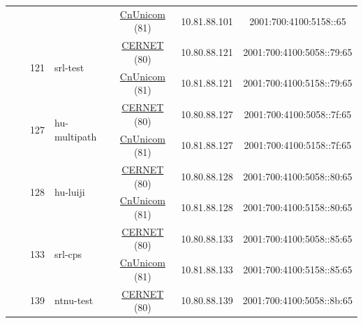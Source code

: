 \begin{small}
\begin{center}
\begin{longtable}{|c|c|c|c|c|c|c|c|}
  &  & \multicolumn{2}{|c|}{} & \multicolumn{2}{|c|}{\tiny{\href{http://www.chinaunicom.com}{CnUnicom} (81)}} & \tiny{10.81.88.101} & \tiny{2001:700:4100:5158::65} \\* \cline{3-3}\cline{4-4}\cline{5-5}\cline{6-6}\cline{7-7}\cline{8-8}
  &  & \multirow{2}{*}{\tiny{121}} & \multicolumn{1}{|l|}{\multirow{2}{*}{\tiny{srl-test}}} & \multicolumn{2}{|c|}{\tiny{\href{http://www.cernet.edu.cn}{CERNET} (80)}} & \tiny{10.80.88.121} & \tiny{2001:700:4100:5058::79:65} \\* \cline{5-5}\cline{6-6}\cline{7-7}\cline{8-8}
  &  &  &  & \multicolumn{2}{|c|}{\tiny{\href{http://www.chinaunicom.com}{CnUnicom} (81)}} & \tiny{10.81.88.121} & \tiny{2001:700:4100:5158::79:65} \\* \cline{3-3}\cline{4-4}\cline{5-5}\cline{6-6}\cline{7-7}\cline{8-8}
  &  & \multirow{2}{*}{\tiny{127}} & \multicolumn{1}{|l|}{\multirow{2}{*}{\tiny{hu-multipath}}} & \multicolumn{2}{|c|}{\tiny{\href{http://www.cernet.edu.cn}{CERNET} (80)}} & \tiny{10.80.88.127} & \tiny{2001:700:4100:5058::7f:65} \\* \cline{5-5}\cline{6-6}\cline{7-7}\cline{8-8}
  &  &  &  & \multicolumn{2}{|c|}{\tiny{\href{http://www.chinaunicom.com}{CnUnicom} (81)}} & \tiny{10.81.88.127} & \tiny{2001:700:4100:5158::7f:65} \\* \cline{3-3}\cline{4-4}\cline{5-5}\cline{6-6}\cline{7-7}\cline{8-8}
  &  & \multirow{2}{*}{\tiny{128}} & \multicolumn{1}{|l|}{\multirow{2}{*}{\tiny{hu-luiji}}} & \multicolumn{2}{|c|}{\tiny{\href{http://www.cernet.edu.cn}{CERNET} (80)}} & \tiny{10.80.88.128} & \tiny{2001:700:4100:5058::80:65} \\* \cline{5-5}\cline{6-6}\cline{7-7}\cline{8-8}
  &  &  &  & \multicolumn{2}{|c|}{\tiny{\href{http://www.chinaunicom.com}{CnUnicom} (81)}} & \tiny{10.81.88.128} & \tiny{2001:700:4100:5158::80:65} \\* \cline{3-3}\cline{4-4}\cline{5-5}\cline{6-6}\cline{7-7}\cline{8-8}
  &  & \multirow{2}{*}{\tiny{133}} & \multicolumn{1}{|l|}{\multirow{2}{*}{\tiny{srl-cps}}} & \multicolumn{2}{|c|}{\tiny{\href{http://www.cernet.edu.cn}{CERNET} (80)}} & \tiny{10.80.88.133} & \tiny{2001:700:4100:5058::85:65} \\* \cline{5-5}\cline{6-6}\cline{7-7}\cline{8-8}
  &  &  &  & \multicolumn{2}{|c|}{\tiny{\href{http://www.chinaunicom.com}{CnUnicom} (81)}} & \tiny{10.81.88.133} & \tiny{2001:700:4100:5158::85:65} \\* \cline{3-3}\cline{4-4}\cline{5-5}\cline{6-6}\cline{7-7}\cline{8-8}
  &  & \multirow{2}{*}{\tiny{139}} & \multicolumn{1}{|l|}{\multirow{2}{*}{\tiny{ntnu-test}}} & \multicolumn{2}{|c|}{\tiny{\href{http://www.cernet.edu.cn}{CERNET} (80)}} & \tiny{10.80.88.139} & \tiny{2001:700:4100:5058::8b:65} \\* \cline{5-5}\cline{6-6}\cline{7-7}\cline{8-8}

\end{longtable}
\end{center}
\end{small}
